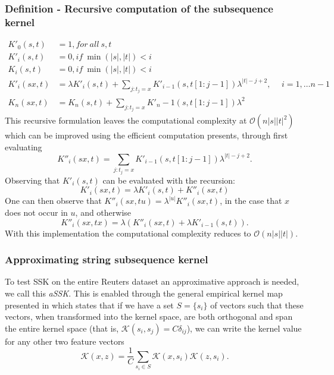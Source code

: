 \subsubsection{Definition - Recursive computation of the subsequence kernel}
\begin{align*}
	K'_{0}(s,t) & = 1, for\ all\ s,t \\
	K'_i(s,t) & = 0, if\ \min(|s|,|t|) < i \\
	K_i(s,t) & = 0, if\ \min(|s|,|t|) < i \\
	K'_i(sx,t) & = \lambda K'_i(s,t) + \sum_{j:t_j=x} K'_{i-1}(s,t[1:j-1])\lambda^{|t|-j+2}, \hspace{15pt} i = 1, \dots n-1 \\	
	K_{n}(sx,t) & = K_n(s,t) + \sum_{j:t_j = x}K'_n-1(s,t[1:j-1])\lambda^2
\end{align*}  
This recursive formulation leaves the computational complexity at $ \mathcal{O}(n|s||t|^2) $ which can be improved using the efficient computation \cite{lodhi} presents, through first evaluating
\begin{equation*}\label{key}
K''_i(sx,t) = \sum_{j:t_j = x}K'_{i-1}(s,t[1:j-1])\lambda^{|t|-j+2}.
\end{equation*}
Observing that $ K'_i(s,t) $ can be evaluated with the recursion:
\begin{equation*}\label{key}
K'_i(sx,t) = \lambda K'_i(s,t) + K''_i(sx,t)
\end{equation*}
One can then observe that $ K''_i(sx,tu) = \lambda^{|u|}K''_i(sx,t)$, in the case that $ x $ does not occur in $ u $, and otherwise 
\begin{equation*}\label{key}
K''_i(sx,tx) = \lambda \left( K''_i(sx,t) + \lambda K'_{i-1}(s,t) \right).
\end{equation*} 
With this implementation the computational complexity reduces to $ \mathcal{O}(n|s||t|) $.



\subsubsection{Approximating string subsequence kernel}
To test SSK on the entire Reuters dataset an approximative approach is needed, we call this \textit{aSSK}. This is enabled through the general empirical kernel map presented in \cite{Scholkopf} which states that if we have a set $ S = \{s_i\} $ of vectors such that these vectors, when transformed into the kernel space, are both orthogonal and span the entire kernel space (that is, $ \mathcal{K}(s_i,s_j) = C\delta_{ij} $), we can write the kernel value for any other two feature vectors
\begin{equation}\label{eq:kernel_approx}
\mathcal{K}(x,z) = \dfrac{1}{C}\sum_{s_i \in S}\mathcal{K}(x,s_i)\mathcal{K}(z,s_i).
\end{equation}

